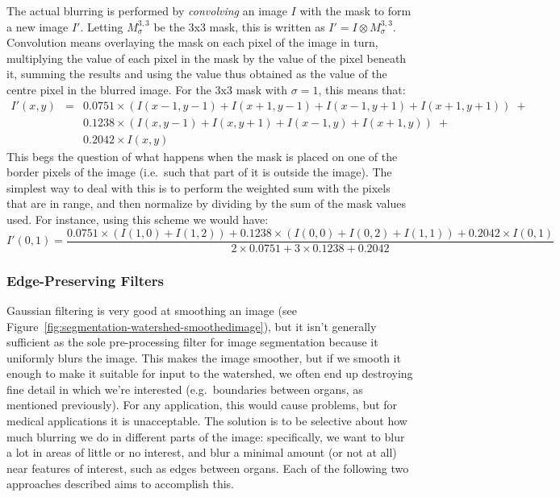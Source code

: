 The actual blurring is performed by \emph{convolving} an image $I$ with the mask to form a new image $I'$. Letting $M_\sigma^{3,3}$ be the 3x3 mask, this is written as $I' = I \otimes M_\sigma^{3,3}$. Convolution means overlaying the mask on each pixel of the image in turn, multiplying the value of each pixel in the mask by the value of the pixel beneath it, summing the results and using the value thus obtained as the value of the centre pixel in the blurred image. For the 3x3 mask with $\sigma = 1$, this means that:
%
\begin{eqnarray*}
I'(x,y)
& = & 0.0751 \times (I(x-1,y-1) + I(x+1,y-1) + I(x-1,y+1) + I(x+1,y+1)) \; + \\
&   & 0.1238 \times (I(x,y-1) + I(x,y+1) + I(x-1,y) + I(x+1,y)) \; + \\
&   & 0.2042 \times I(x,y)
\end{eqnarray*}
%
This begs the question of what happens when the mask is placed on one of the border pixels of the image (i.e.~such that part of it is outside the image). The simplest way to deal with this is to perform the weighted sum with the pixels that are in range, and then normalize by dividing by the sum of the mask values used. For instance, using this scheme we would have:
%
\[
I'(0,1) = \frac{0.0751 \times (I(1,0) + I(1,2)) + 0.1238 \times (I(0,0) + I(0,2) + I(1,1)) + 0.2042 \times I(0,1)}{2 \times 0.0751 + 3 \times 0.1238 + 0.2042}
\]

\subsubsection{Edge-Preserving Filters}

Gaussian filtering is very good at smoothing an image (see Figure~\ref{fig:segmentation-watershed-smoothedimage}), but it isn't generally sufficient as the sole pre-processing filter for image segmentation because it uniformly blurs the image. This makes the image smoother, but if we smooth it enough to make it suitable for input to the watershed, we often end up destroying fine detail in which we're interested (e.g.~boundaries between organs, as mentioned previously). For any application, this would cause problems, but for medical applications it is unacceptable. The solution is to be selective about how much blurring we do in different parts of the image: specifically, we want to blur a lot in areas of little or no interest, and blur a minimal amount (or not at all) near features of interest, such as edges between organs. Each of the following two approaches described aims to accomplish this.

